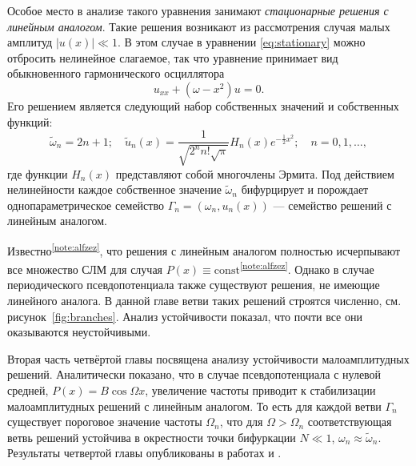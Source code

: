 \documentclass[candidate, href, colorlinks]{disser}
\begin{document}
Особое место в анализе такого уравнения занимают {\it стационарные решения с линейным аналогом}.
Такие решения возникают из рассмотрения случая малых амплитуд $|u(x)| \ll 1$.
В этом случае в уравнении \eqref{eq:stationary} можно отбросить нелинейное слагаемое, так что уравнение принимает вид обыкновенного гармонического осциллятора
\begin{equation}
	u_{xx} + (\omega - x^2) u = 0.
\end{equation}
Его решением является следующий набор собственных значений и собственных функций:
\begin{equation}
	\tilde{\omega}_n = 2n + 1; \quad \tilde{u}_n(x) = \dfrac{1}{\sqrt{2^n n! \sqrt{\pi}}} H_n(x) e^{-\frac{1}{2} x^2}; \quad n = 0, 1, \dots,
\label{eq:ho}
\end{equation}
где функции $H_n(x)$ представляют собой многочлены Эрмита.
Под действием нелинейности каждое собственное значение $\tilde{\omega}_n$ бифурцирует и порождает однопараметрическое семейство $\Gamma_n = (\omega_n, u_n(x))$ --- семейство решений с линейным аналогом.

Известно\textsuperscript{\ref{note:alfzez}}, что решения с линейным аналогом полностью исчерпывают все множество СЛМ для случая $P(x) \equiv \mathrm{const}$\textsuperscript{\ref{note:alfzez}}.
Однако в случае периодического псевдопотенциала также существуют решения, не имеющие линейного аналога.
В данной главе ветви таких решений строятся численно, см. рисунок~\ref{fig:branches}.
Анализ устойчивости показал, что почти все они оказываются неустойчивыми.

Вторая часть четвёртой главы посвящена анализу устойчивости малоамплитудных решений.
Аналитически показано, что в случае псевдопотенциала с нулевой средней, $P(x) = B \cos \Omega x$, увеличение частоты приводит к стабилизации малоамплитудных решений с линейным аналогом.
То есть для каждой ветви $\Gamma_n$ существует пороговое значение частоты $\Omega_n$, что для $\Omega > \Omega_n$ соответствующая ветвь решений устойчива в окрестности точки бифуркации $N \ll 1$, $\omega_n \approx \tilde{\omega}_n$.
Результаты четвертой главы опубликованы в работах \cite{AlfimovGegelLebedevMalomedZezyulin} и \cite{Bannoe2018}.
\end{document}
